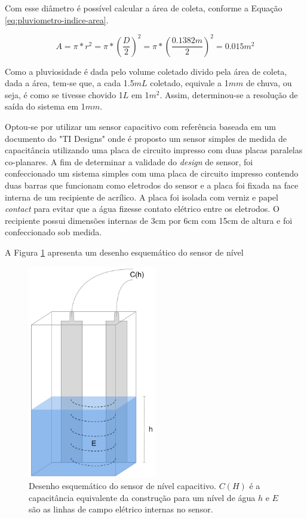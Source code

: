 \documentclass[a4paper]{instrumentacao}
\begin{document}
Com esse diâmetro é possível calcular a área de coleta, conforme a Equação \ref{eq:pluviometro-indice-area}.

\begin{equation}
	A=\pi*r^2=\pi*\left ( \frac{D}{2} \right )^2=\pi*\left ( \frac{0.1382m}{2} \right )^2=0.015m^2
	\label{eq:pluviometro-indice-area}
\end{equation}

Como a pluviosidade é dada pelo volume coletado divido pela área de coleta, dada a área, tem-se que, a cada 1.5$mL$ coletado, equivale a 1$mm$ de chuva, ou seja, é como se tivesse chovido 1$L$ em 1$m^2$. Assim, determinou-se a resolução de saída do sistema em 1$mm$.

Optou-se por utilizar um sensor capacitivo com referência baseada em um documento do "TI Designs"\cite{pluviometro-capacitivo-texas} onde é proposto um sensor simples de medida de capacitância utilizando uma placa de circuito impresso com duas placas paralelas co-planares. A fim de determinar a validade do \textit{design} de sensor, foi confeccionado um sistema simples com uma placa de circuito impresso contendo duas barras que funcionam como eletrodos do sensor e a placa foi fixada na face interna de um recipiente de acrílico. A placa foi isolada com verniz e papel \textit{contact} para evitar que a água fizesse contato elétrico entre os eletrodos. O recipiente possui dimensões internas de 3cm por 6cm com 15cm de altura e foi confeccionado sob medida.

A Figura \ref{fig:sensor-nivel-capacitivo} apresenta um desenho esquemático do sensor de nível

\begin{figure}[H]
	\centering \includegraphics[width=0.5\textwidth]{SensorNivelCapacitivo.pdf}
	\caption{Desenho esquemático do sensor de nível capacitivo. $C(H)$ é a capacitância equivalente da construção para um nível de água $h$ e $E$ são as linhas de campo elétrico internas no sensor.}
	\label{fig:sensor-nivel-capacitivo}
\end{figure}
\end{document}
